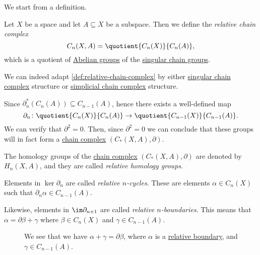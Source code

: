 We start from a definition.
\begin{definition}\label{def:relative-chain-complex}
	Let \(X\) be a space and let \(A \subseteq X\) be a subspace. Then we define the \emph{relative chain complex}
	\[
		C_n(X, A) = \quotient{C_n(X)}{C_n(A)},
	\]
	which is a quotient of \hyperref[def:Abelian-group]{Abelian groups} of the \hyperref[def:singular-chain]{singular chain groups}.
\end{definition}
\begin{remark}
	We can indeed adapt \autoref{def:relative-chain-complex} by either \hyperref[def:singular-chain]{singular chain complex}
	structure or \hyperref[def:simplicial-complex]{simplicial chain complex} structure.
\end{remark}

\begin{exercise}
	Since \(\partial^\ast_n(C_{n} (A))\subseteq C_{n-1}(A) \), hence there exists a well-defined map
	\[
		\partial_n\colon \quotient{C_{n} (X)}{C_{n} (A)} \to \quotient{C_{n-1} (X)}{C_{n-1}(A)}.
	\]
	We can verify that \(\partial^{2} =0\). Then, since \(\partial^2 = 0\) we can conclude that these groups will in fact form a
	\hyperref[def:chain-complex]{chain complex} \((C_\ast(X, A), \partial)\).
\end{exercise}

\begin{definition}\label{def:relative-homology}
	The homology groups of the \hyperref[def:chain-complex]{chain complex} \((C_\ast(X, A), \partial)\) are denoted
	by \(H_n(X, A)\), and they are called \emph{relative homology groups}.

	Elements in \(\ker \partial_n\) are called \emph{relative \(n\)-cycles}\label{def:relative-cycle}. These are elements
	\(\alpha \in C_n(X)\) such that \(\partial_n\alpha \in C_{n - 1}(A)\).
	\begin{figure}[H]
		\centering
		\label{fig:def:relative-homology-1}
	\end{figure}

	Likewise, elements in \(\im \partial_{n + 1}\) are called \emph{relative \(n\)-boundaries}\label{def:relative-boundary}.
	This means that \(\alpha = \partial \beta + \gamma\) where \(\beta \in C_n(X)\) and \(\gamma \in C_{n - 1}(A)\).
	\begin{figure}[H]
		\centering
		\caption{We see that we have \(\alpha +\gamma =\partial \beta \), where \(\alpha \) is a \hyperref[def:relative-boundary]{relative boundary},
			and \(\gamma \in C_{n-1}(A)\).}
		\label{fig:def:relative-homology-2}
	\end{figure}
\end{definition}


